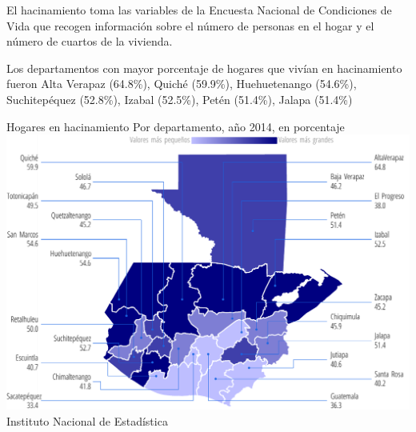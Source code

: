         {%
        El hacinamiento toma las variables de la Encuesta Nacional de Condiciones de Vida que recogen información sobre el número de personas en el hogar y el número de cuartos de la vivienda.
        
        Los departamentos con mayor porcentaje de hogares que vivían en hacinamiento fueron Alta Verapaz (64.8\%), Quiché (59.9\%), Huehuetenango (54.6\%), Suchitepéquez (52.8\%), Izabal (52.5\%), Petén (51.4\%), Jalapa (51.4\%) }%
        {%
        	Hogares en hacinamiento
        } %
        {%
        	Por departamento, año 2014, en porcentaje} %
        {%
        	\includegraphics[width=52\cuadri]{graficas/1_13.pdf}}%
        {%
        	Instituto Nacional de Estadística} %
        
        
          
          
